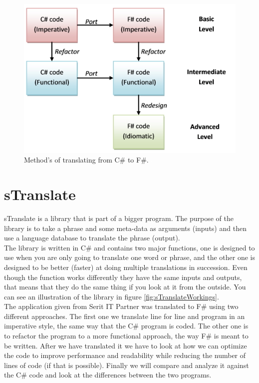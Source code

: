 \documentclass[12pt, a4paper]{article}
\begin{document}
\begin{figure}[!h]
    \includegraphics[scale=0.6]{image01}
    \centering
    \caption{Method's of translating from C\# to F\#.}
\end{figure}



\newpage

\section{sTranslate}
sTranslate is a library that is part of a bigger program. The purpose of the library is to take a phrase and some meta-data as arguments (inputs) and then use a language database to translate the phrase (output).\\

The library is written in C\# and contains two major functions, one is designed to use when you are only going to translate one word or phrase, and the other one is designed to be better (faster) at doing multiple translations in succession. Even though the function works differently they have the same inputs and outputs, that means that they do the same thing if you look at it from the outside. You can see an illustration of the library in figure \ref{fig:sTranslateWorkings}.\\

The application given from Serit IT Partner was translated to F\# using two different approaches. The first one we translate line for line and program in an imperative style, the same way that the C\# program is coded. The other one is to refactor the program to a more functional approach, the way F\# is meant to be written. After we have translated it we have to look at how we can optimize the code to improve performance and readability while reducing the number of lines of code (if that is possible). Finally we will compare and analyze it against the C\# code and look at the differences between the two programs.\\
\end{document}
